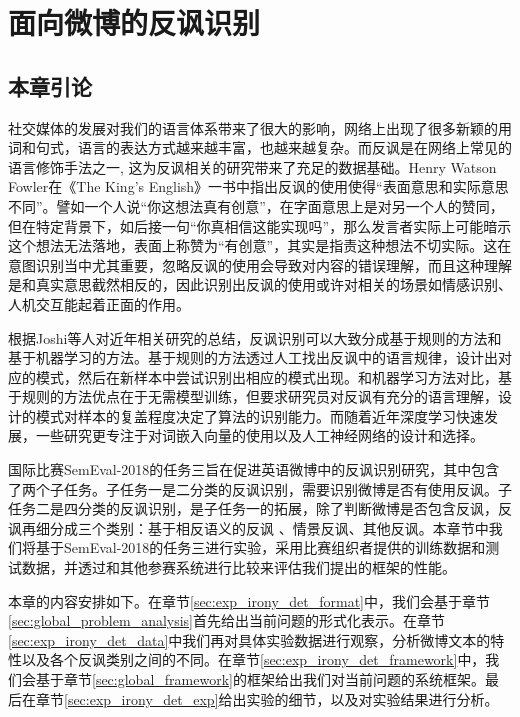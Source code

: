 \chapter{面向微博的反讽识别}
\label{cha:exp_irony_det}

\section{本章引论}

社交媒体的发展对我们的语言体系带来了很大的影响，网络上出现了很多新颖的用词和句式，语言的表达方式越来越丰富，也越来越复杂。而反讽是在网络上常见的语言修饰手法之一, 这为反讽相关的研究带来了充足的数据基础。Henry Watson Fowler在《The King's English》一书中指出反讽的使用使得“表面意思和实际意思不同”。譬如一个人说“你这想法真有创意”，在字面意思上是对另一个人的赞同，但在特定背景下，如后接一句“你真相信这能实现吗”，那么发言者实际上可能暗示这个想法无法落地，表面上称赞为“有创意”，其实是指责这种想法不切实际。这在意图识别当中尤其重要，忽略反讽的使用会导致对内容的错误理解，而且这种理解是和真实意思截然相反的，因此识别出反讽的使用或许对相关的场景如情感识别、人机交互能起着正面的作用。

根据Joshi等人\cite{joshi2017automatic}对近年相关研究的总结，反讽识别可以大致分成基于规则的方法和基于机器学习的方法。基于规则的方法透过人工找出反讽中的语言规律，设计出对应的模式，然后在新样本中尝试识别出相应的模式出现。和机器学习方法对比，基于规则的方法优点在于无需模型训练，但要求研究员对反讽有充分的语言理解，设计的模式对样本的复盖程度决定了算法的识别能力。而随着近年深度学习快速发展，一些研究更专注于对词嵌入向量的使用以及人工神经网络的设计和选择。

国际比赛SemEval-2018的任务三\cite{van2018semeval}旨在促进英语微博中的反讽识别研究，其中包含了两个子任务。子任务一是二分类的反讽识别，需要识别微博是否有使用反讽。子任务二是四分类的反讽识别，是子任务一的拓展，除了判断微博是否包含反讽，反讽再细分成三个类别：基于相反语义的反讽 
、情景反讽、其他反讽。本章节中我们将基于SemEval-2018的任务三进行实验，采用比赛组织者提供的训练数据和测试数据，并透过和其他参赛系统进行比较来评估我们提出的框架的性能。

本章的内容安排如下。在章节\ref{sec:exp_irony_det_format}中，我们会基于章节\ref{sec:global_problem_analysis}首先给出当前问题的形式化表示。在章节\ref{sec:exp_irony_det_data}中我们再对具体实验数据进行观察，分析微博文本的特性以及各个反讽类别之间的不同。在章节\ref{sec:exp_irony_det_framework}中，我们会基于章节\ref{sec:global_framework}的框架给出我们对当前问题的系统框架。最后在章节\ref{sec:exp_irony_det_exp}给出实验的细节，以及对实验结果进行分析。

